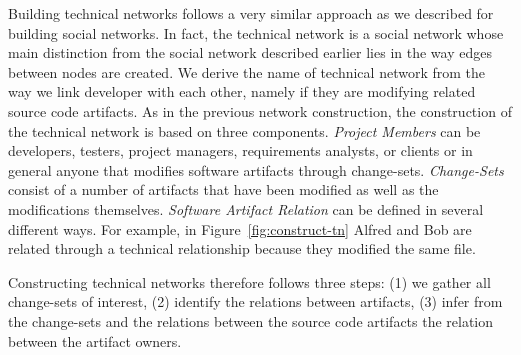 Building technical networks follows a very similar approach as we described for building social networks.
In fact, the technical network is a social network whose main distinction from the social network described earlier lies in the way edges between nodes are created.
We derive the name of technical network from the way we link developer with each other, namely if they are modifying related source code artifacts.
As in the previous network construction, the construction of the technical network is based on three components.
%
\emph{Project Members}  can be developers, testers, project managers, requirements analysts,
or clients or in general anyone that modifies software artifacts through change-sets. 
%
\emph{Change-Sets} consist of a number of artifacts that have been modified as well as the modifications themselves.
%
\emph{Software Artifact Relation}  can be defined in several different ways.
For example, in Figure~\ref{fig:construct-tn} Alfred and Bob are related through a technical relationship because they modified the same file.

Constructing technical networks therefore follows three steps: (1) we gather all change-sets of interest, (2) identify the relations between artifacts, (3) infer from the change-sets and the relations between the source code artifacts the relation between the artifact owners.

